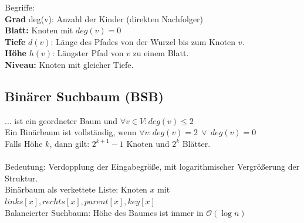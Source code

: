 \documentclass[fs, footer]{latex4ei}
\begin{document}
\begin{multicols*}{4}
{{Begriffe:\\
\textbf{Grad} deg(v): Anzahl der Kinder (direkten Nachfolger)\\
\textbf{Blatt:} Knoten mit $deg(v) = 0$\\
\textbf{Tiefe} $d(v)$: Länge des Pfades von der Wurzel bis zum Knoten $v$.\\ 
\textbf{Höhe} $h(v)$: Längster Pfad von $v$ zu einem Blatt.\\   
\textbf{Niveau:} Knoten mit gleicher Tiefe.\\

\subsection{Binärer Suchbaum (BSB)}
... ist ein geordneter Baum und $\forall v \in V:deg(v) \le 2$\\
Ein Binärbaum ist vollständig, wenn $\forall v: deg(v) = 2 \ \lor \ deg(v)=0$\\ 
Falls Höhe $k$, dann gilt: $2^{k+1} - 1$ Knoten und $2^k$ Blätter.\\ 
\\
Bedeutung: Verdopplung der Eingabegröße, mit logarithmischer Vergrößerung der Struktur.\\
Binärbaum als verkettete Liste: Knoten $x$ mit $links[x],rechts[x], parent[x], key[x]$\\
Balancierter Suchbaum: Höhe des Baumes ist immer in $\mathcal O(\log n)$\\
}}
\end{multicols*}
\end{document}
